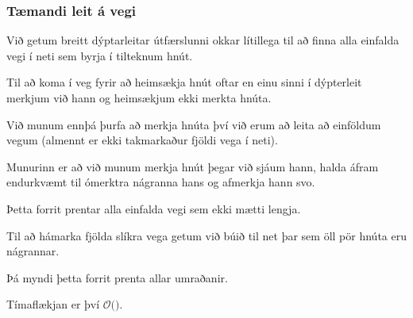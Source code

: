 {
}

{
	\frametitle{Tæmandi leit á vegi}
	{
		\item<1-> Við getum breitt dýptarleitar útfærslunni okkar lítillega til að finna alla einfalda vegi í neti sem byrja í tilteknum hnút.
		\item<2-> Til að koma í veg fyrir að heimsækja hnút oftar en einu sinni í dýpterleit merkjum við hann og heimsækjum ekki merkta hnúta.
		\item<3-> Við munum ennþá þurfa að merkja hnúta því við erum að leita að einföldum vegum (almennt er ekki takmarkaður fjöldi vega í neti).
		\item<4-> Munurinn er að við munum merkja hnút þegar við sjáum hann, halda áfram endurkvæmt til ómerktra nágranna hans og afmerkja hann svo.
	}
}

{
	{
		\item<1->[]	
		\item<2-> Þetta forrit prentar alla einfalda vegi sem ekki mætti lengja.
		\item<3-> Til að hámarka fjölda slíkra vega getum við búið til net þar sem öll pör hnúta eru nágrannar.
		\item<4-> Þá myndi þetta forrit prenta allar umraðanir.
		\item<5-> Tímaflækjan er því $\mathcal{O}($\onslide<6->{$(V + 1)!$}$)$.
	}
}

{
}


